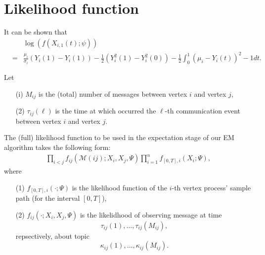 \documentclass[12pt]{article}%
\begin{document}
\section{Likelihood function}
It can be shown that
\begin{eqnarray}
&\ &\log (f(X_{i,1}(t);\psi))\\
&= & \frac{\mu_i}{\sigma_i} (Y_{i}(1) - Y_{i}(1)) - \frac{1}{2} (Y_{i}^2(1) - Y_i^2(0)) - \frac{1}{2} \int_0^1 (\mu_i-Y_{i}(t))^2 - 1 dt. 
\end{eqnarray}



Let
\begin{enumerate}
\item[(i)] $M_{ij}$ is the (total) number of messages between vertex $i$ and vertex $j$,
\item[(2)] $\tau_{ij}(\ell)$ is the time at which occurred the $\ell$-th communication event 
between vertex $i$ and vertex $j$.
\end{enumerate}
The (full) likelihood function to be used in the expectation stage of our EM algorithm takes the following form:
\begin{eqnarray}
\prod_{i<j} f_{ij}(\mathcal M(ij);X_i,X_j,\Psi) \prod_{i=1}^n f_{[0,T],i}(X_i;\Psi),
\end{eqnarray}
where 
\begin{enumerate}
\item[(1)] $f_{[0,T],i}(\cdot;\Psi)$ is the likelihood function of the $i$-th vertex 
process' sample path (for the interval $[0,T]$),
\item[(2)] $f_{ij}(\cdot;X_i,X_j,\Psi)$ is the likelidhood of 
observing message at time 
$$
\tau_{ij}(1),\ldots, \tau_{ij}(M_{ij}),
$$
repsectively, about topic 
$$
\kappa_{ij}(1),\ldots, \kappa_{ij}(M_{ij}).
$$
\end{enumerate}
\end{document}
